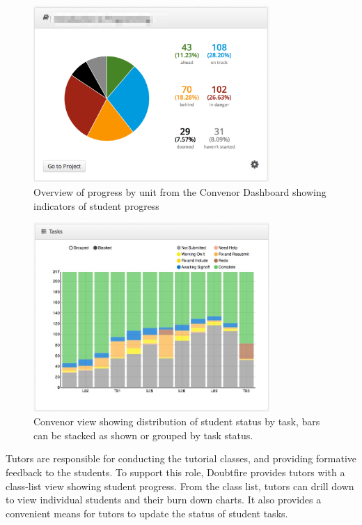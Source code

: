 \begin{figure}[thbp]
  \centering
  \includegraphics[width=0.8\textwidth]{Dashboard}%
  \caption{Overview of progress by unit from the Convenor Dashboard showing indicators of student progress}%
  \label{fig:dashboard}%
\end{figure}

\begin{figure}[thbp]
  \centering
  \includegraphics[width=0.8\textwidth]{TaskChart}%
  \caption{Convenor view showing distribution of student status by task, bars can be stacked as shown or grouped by task status.}%
  \label{fig:task_chart_view}%
\end{figure}

Tutors are responsible for conducting the tutorial classes, and providing formative feedback to the students. To support this role, Doubtfire provides tutors with a class-list view showing student progress. From the class list, tutors can drill down to view individual students and their burn down charts. It also provides a convenient means for tutors to update the status of student tasks. 


